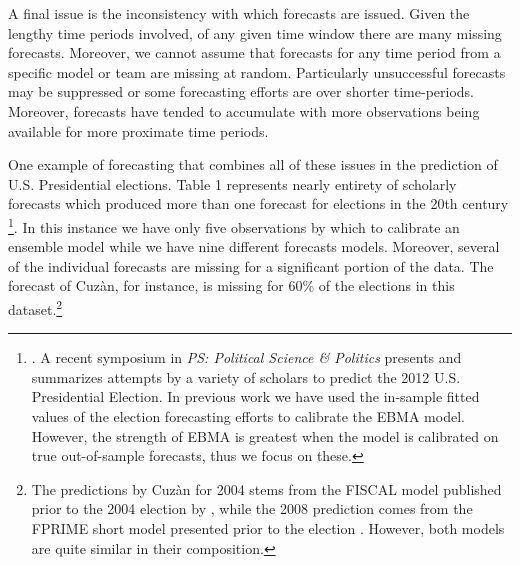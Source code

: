 \documentclass[12pt,fullpage,endnotes]{article}
\begin{document}
A final issue is the inconsistency with which forecasts are
issued. Given the lengthy time periods involved, of any given time
window there are many missing forecasts.  Moreover, we cannot assume
that forecasts for any time period from a specific model or team are
missing at random.  Particularly unsuccessful forecasts may be
suppressed or some forecasting efforts are over shorter time-periods.  Moreover, forecasts have tended to accumulate with more
observations being available for more proximate time periods.

One example of forecasting that combines all of these issues in the
prediction of U.S. Presidential elections.  Table 1 represents nearly
entirety of scholarly forecasts which produced more than one forecast
for elections in the 20th century \footnote{
\cite[See, for example]{Fair:2009,Fair2011,Abramowitz:2008,Campbell:2008,hibbs:2012,Lockerbie:2008,Erikson:Wlezien:2008,Graefe:2010,Holbrook:2008}.
A recent symposium in {\em PS: Political Science \& Politics} presents and summarizes attempts by a variety of scholars to predict the 2012 U.S. Presidential Election. In previous work \citep{mhw:2012} we have used the in-sample fitted values of the election forecasting efforts to calibrate the EBMA model. However, the strength of EBMA is greatest when the model is calibrated on true out-of-sample forecasts, thus we focus on these.}.  In this instance
we have only five observations by which to calibrate an ensemble model while we
have nine different forecasts models.  Moreover, several of the individual forecasts
are missing for a significant portion of the data.  The forecast of
Cuz\`an, for instance, is missing for 60\% of the elections in this
dataset.\footnote{The predictions by Cuz\`an for 2004 stems from the FISCAL model published prior to the 2004 election by \citet{Cuzan:2004}, while the 2008 prediction comes from the FPRIME short model presented prior to the election \citep{Cuzan:Bundrick:2008}. However, both models are quite similar in their composition.} 
\end{document}
